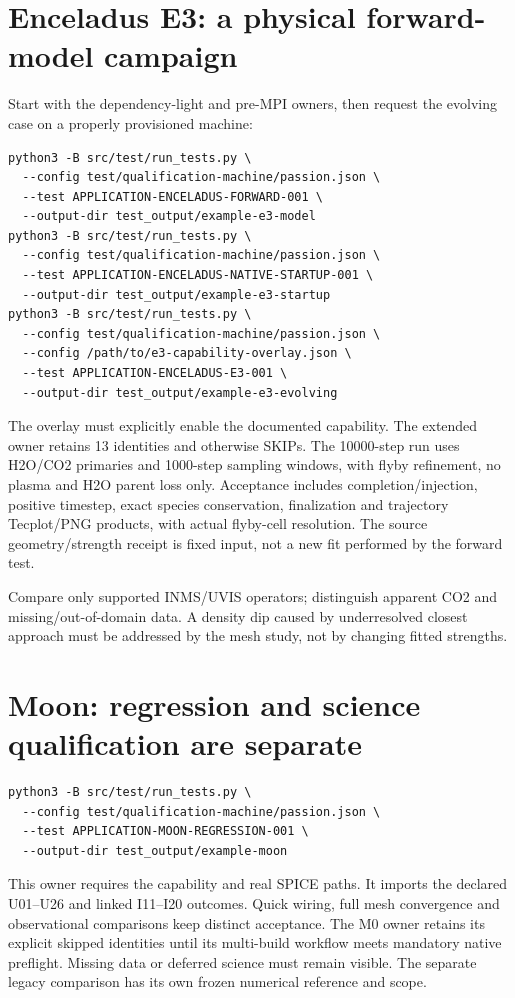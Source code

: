 \section{Enceladus E3: a physical forward-model campaign}
Start with the dependency-light and pre-MPI owners, then request the evolving
case on a properly provisioned machine:
\begin{lstlisting}
python3 -B src/test/run_tests.py \
  --config test/qualification-machine/passion.json \
  --test APPLICATION-ENCELADUS-FORWARD-001 \
  --output-dir test_output/example-e3-model
python3 -B src/test/run_tests.py \
  --config test/qualification-machine/passion.json \
  --test APPLICATION-ENCELADUS-NATIVE-STARTUP-001 \
  --output-dir test_output/example-e3-startup
python3 -B src/test/run_tests.py \
  --config test/qualification-machine/passion.json \
  --config /path/to/e3-capability-overlay.json \
  --test APPLICATION-ENCELADUS-E3-001 \
  --output-dir test_output/example-e3-evolving
\end{lstlisting}
The overlay must explicitly enable the documented 
capability. The extended owner retains 13 identities and otherwise SKIPs.
The 10000-step run uses H2O/CO2 primaries and 1000-step sampling windows,
with flyby refinement, no plasma and H2O parent loss only. Acceptance includes
completion/injection, positive timestep, exact species conservation,
finalization and trajectory Tecplot/PNG products, with actual flyby-cell
resolution. The source geometry/strength receipt is fixed input, not a new
fit performed by the forward test.

Compare only supported INMS/UVIS operators; distinguish apparent CO2 and
missing/out-of-domain data. A density dip caused by underresolved closest
approach must be addressed by the mesh study, not by changing fitted strengths.

\section{Moon: regression and science qualification are separate}
\begin{lstlisting}
python3 -B src/test/run_tests.py \
  --config test/qualification-machine/passion.json \
  --test APPLICATION-MOON-REGRESSION-001 \
  --output-dir test_output/example-moon
\end{lstlisting}
This owner requires the  capability and real SPICE paths.
It imports the declared U01--U26 and linked I11--I20 outcomes. Quick wiring,
full mesh convergence and observational comparisons keep distinct acceptance.
The M0 owner retains its explicit skipped identities until its multi-build
workflow meets mandatory native preflight. Missing data or deferred science
must remain visible. The separate legacy  comparison
has its own frozen numerical reference and scope.

